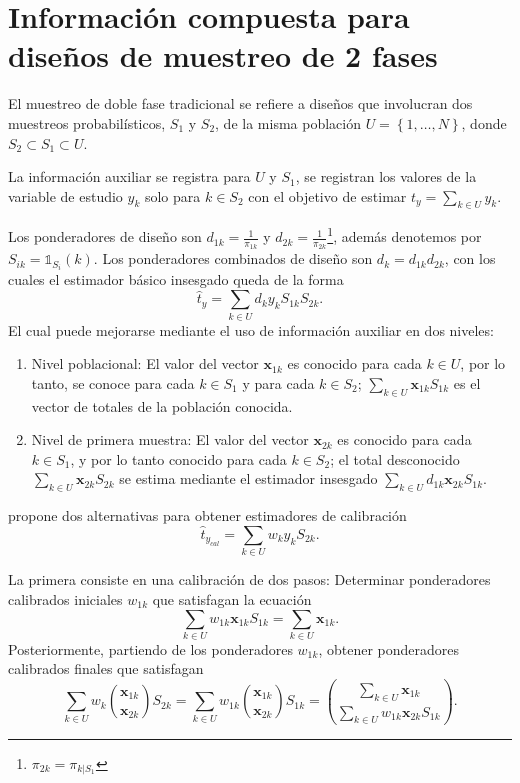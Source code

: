 \documentclass[a4paper,twoside,openright,12pt]{book}
\def\one{\mathds{1}}%
\theoremstyle{definition}
\numberwithin{equation}{chapter}
\numberwithin{figure}{chapter}
\numberwithin{table}{chapter}
\numberwithin{theorem}{chapter}
\numberwithin{lemma}{chapter}
\begin{document}
\section{Información compuesta para diseños de muestreo de 2 fases}
El muestreo de doble fase tradicional se refiere a diseños que involucran dos muestreos probabilísticos, $S_1$ y $S_2$, de la misma población $U = \left\{1,\ldots, N\right\}$, donde $S_2\subset S_1\subset U$.

La información auxiliar se registra para $U$ y $S_1$, se registran los valores de la variable de estudio $y_k$ solo para $k\in S_2$ con el objetivo de estimar $t_{y}=\sum_{k\in U} y_k$.

Los ponderadores de diseño son $d_{1k}=\frac{1}{\pi_{1k}}$ y $d_{2k}=\frac{1}{\pi_{2k}}$\footnote{$\pi_{2k}=\pi_{k|S_1}$}, además denotemos por $S_{ik}=\one_{S_i}(k)$. Los ponderadores combinados de diseño son $d_k=d_{1k}d_{2k}$, con los cuales el estimador básico insesgado queda de la forma
$$\hat t_y=\sum_{k\in U}d_k y_k S_{1k} S_{2k}.$$
El cual puede mejorarse mediante el uso de información auxiliar en dos niveles:
\begin{enumerate}
	\item Nivel poblacional: El valor del vector $\mathbf x_{1k}$ es conocido para cada $k\in U$, por lo tanto, se conoce para cada $k\in S_1$ y para cada $k\in S_2$; $\sum_{k\in U}\mathbf{x}_{1k}S_{1k}$ es el vector de totales de la población conocida.
	\item Nivel de primera muestra: El valor del vector $\mathbf x_{2k}$ es conocido para cada $k\in S_1$, y por lo tanto conocido para cada $k\in S_2$; el total desconocido $\sum_{k\in U}\mathbf{x}_{2k}S_{2k}$ se estima mediante el estimador insesgado $\sum_{k\in U}d_{1k}\mathbf{x}_{2k}S_{1k}.$
\end{enumerate}
\cite{CIS-129990} propone dos alternativas para obtener estimadores de calibración
$$\hat t_{y_{cal}}=\sum_{k\in U} w_k y_k S_{2k}.$$

La primera consiste en una calibración de dos pasos: Determinar ponderadores calibrados iniciales $w_{1k}$ que satisfagan la ecuación
$$\sum_{k\in U} w_{1k} \mathbf x_{1k} S_{1k}=\sum_{k\in U} \mathbf x_{1k}.$$
Posteriormente, partiendo de los ponderadores $w_{1k}$, obtener ponderadores calibrados finales que satisfagan
$$\sum_{k\in U} w_{k} \binom{\mathbf x_{1k}}{\mathbf x_{2k}} S_{2k}=\sum_{k\in U} w_{1k}\binom{\mathbf x_{1k}}{\mathbf x_{2k}} S_{1k}=\binom{\sum_{k\in U} \mathbf x_{1k}}{\sum_{k\in U} w_{1k}\mathbf x_{2k}S_{1k}}.$$
\end{document}
